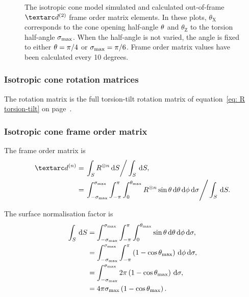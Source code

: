 \begin{figure}
\begin{tabular}{@{}cc@{}}
  \end{tabular}
  \caption[Isotropic cone simulated and calculated out-of-frame Daeg$^{(2)}$ elements.]{
    The isotropic cone model simulated and calculated out-of-frame $\FOtwo$ frame order matrix elements.
    In these plots, $\theta_\textrm{X}$ corresponds to the cone opening half-angle $\theta$ and $\theta_\textrm{Z}$ to the torsion half-angle $\sigma_\textrm{max}$.
    When the half-angle is not varied, the angle is fixed to either $\theta = \pi/4$ or $\sigma_\textrm{max} = \pi/6$.
    Frame order matrix values have been calculated every 10 degrees.
  }
  \label{fig: simulated and calculated out-of-frame 2nd degree iso cone frame order}
\end{figure}


\subsubsection{Isotropic cone rotation matrices}

The rotation matrix is the full torsion-tilt rotation matrix of equation~\ref{eq: R torsion-tilt} on page~\pageref{eq: R torsion-tilt}.


\subsubsection{Isotropic cone frame order matrix}


The frame order matrix is
\begin{subequations}
\begin{align}
    \FOn &= \left. \int_S R^{\otimes n} \diff S \right / \int_S \diff S , \\
         &= \left. \int_{-\conesmax}^{\conesmax} \int_{-\pi}^{\pi} \int_{0}^{\conethetamax} R^{\otimes n} \sin\theta \diff\theta \diff\phi \diff\sigma  \right / \int_S \diff S .
\end{align}
\end{subequations}

The surface normalisation factor is
\begin{subequations}
\begin{align}
    \int_S \,\mathrm{d} S &= \int_{-\sigma_\textrm{max}}^{\sigma_\textrm{max}} \int_{-\pi}^{\pi} \int_{0}^{\theta_\textrm{max}} \sin\theta \,\mathrm{d}\theta \,\mathrm{d}\phi \,\mathrm{d}\sigma , \\
                   &= \int_{-\sigma_\textrm{max}}^{\sigma_\textrm{max}} \int_{-\pi}^{\pi} \left( 1 - \cos\theta_\textrm{max} \right) \,\mathrm{d}\phi \,\mathrm{d}\sigma , \\
                   &= \int_{-\sigma_\textrm{max}}^{\sigma_\textrm{max}} 2\pi \left( 1 - \cos\theta_\textrm{max} \right) \,\mathrm{d}\sigma , \\
                   &= 4\pi \sigma_\textrm{max} \left( 1 - \cos\theta_\textrm{max} \right) .
\end{align}
\end{subequations}


